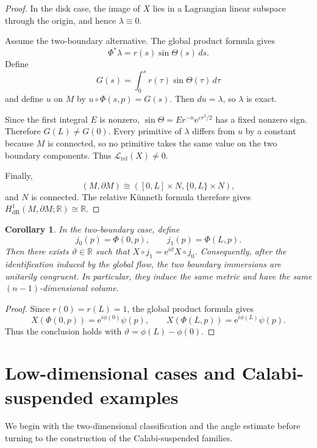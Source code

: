 \documentclass[11pt,a4paper]{article}
\numberwithin{equation}{section}
\newtheorem{corollary}[theorem]{Corollary}
\newcommand{\ee}{\mathrm e}
\begin{document}
\begin{proof}
In the disk case, the image of $X$ lies in a Lagrangian linear subspace
through the origin, and hence $\lambda\equiv0$.

Assume the two-boundary alternative.  The global product formula gives
\[
        \Phi^*\lambda=r(s)\sin\Theta(s)\,ds.
\]
Define
\[
        G(s)=\int_0^s r(\tau)\sin\Theta(\tau)\,d\tau
\]
and define $u$ on $M$ by $u\circ\Phi(s,p)=G(s)$.  Then $du=\lambda$, so
$\lambda$ is exact.

Since the first integral $E$ is nonzero,
\(
        \sin\Theta
        =E r^{-n}\ee^{\varepsilon r^2/2}
\)
has a fixed nonzero sign.  Therefore $G(L)\ne G(0)$.  Every primitive of
$\lambda$ differs from $u$ by a constant because $M$ is connected, so no
primitive takes the same value on the two boundary components.  Thus
$\mathcal L_{\mathrm{rel}}(X)\ne0$.

Finally,
\[
 (M,\partial M)\cong
 ([0,L]\times N,\{0,L\}\times N),
\]
and $N$ is connected.  The relative K\"unneth formula therefore gives
\(
 H^1_{\mathrm{dR}}(M,\partial M;\mathbb R)\cong\mathbb R.
\)
\end{proof}


\begin{corollary}
\label{cor:boundary-congruence}
In the two-boundary case, define
\[
        j_0(p)=\Phi(0,p),
        \qquad
        j_1(p)=\Phi(L,p).
\]
Then there exists $\vartheta\in\mathbb R$ such that
\(
        X\circ j_1
        =\ee^{i\vartheta}X\circ j_0
\).
Consequently, after the identification induced by the global flow, the two
boundary immersions are unitarily congruent.  In particular, they induce the
same metric and have the same $(n-1)$-dimensional volume.
\end{corollary}

\begin{proof}
Since $r(0)=r(L)=1$, the global product formula gives
\[
        X(\Phi(0,p))=\ee^{i\phi(0)}\psi(p),
        \qquad
        X(\Phi(L,p))=\ee^{i\phi(L)}\psi(p).
\]
Thus the conclusion holds with
$\vartheta=\phi(L)-\phi(0)$.
\end{proof}

\section{Low-dimensional cases and Calabi-suspended examples}\label{sec:calabi-realizations}
  We begin with the two-dimensional classification and the angle estimate before turning to the construction of the Calabi-suspended families.
\end{document}
